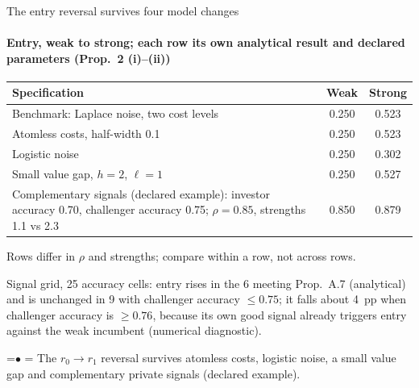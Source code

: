 \documentclass[10pt,aspectratio=169]{beamer}
\newcommand{\TakeawayBody}[1]{\begin{minipage}{\textwidth}\raggedright\normalsize
    \setbox0=\hbox{{\usebeamercolor[fg]{structure}\raise0.7pt\hbox{\scriptsize$\bullet$}}\hspace{0.55em}}%
    \hangindent=\wd0 \hangafter=1 \noindent\box0 #1\par
  \end{minipage}}
\renewcommand{\TakeawayWithNav}[2][\ExhibitReadingGap]{\par\vspace{#1}\noindent\TakeawayBody{#2}\par\vspace{0.45cm}}
\begin{document}
\begin{frame}[label=F13]{The entry reversal survives four model changes}
\framesubtitle{Entry, weak to strong; each row its own analytical result and declared parameters (Prop.~2 (i)--(ii))}
\hypertarget{main:robust}{}
\vspace{2pt}
\begin{center}\small
\begin{tabular}{@{}>{\raggedright\arraybackslash}p{10.4cm}cc@{}}
\toprule
Specification & Weak & Strong\\
\midrule
Benchmark: Laplace noise, two cost levels & 0.250 %
 & 0.523\\ %
Atomless costs, half-width 0.1 %
 & 0.250 %
 & 0.523\\ %
Logistic noise & 0.250 %
 & 0.302\\ %
Small value gap, $h=2$, %
$\ell=1$ %
 & 0.250 %
 & 0.527\\ %
Complementary signals (declared example): investor accuracy 0.70, %
challenger accuracy 0.75; %
$\rho=0.85$, %
strengths 1.1 %
vs 2.3 %
 & 0.850 %
 & 0.879\\ %
\bottomrule
\end{tabular}
\end{center}
\vspace{-3pt}
{\color{cGrayText}\footnotesize Rows differ in $\rho$ and strengths; compare within a row, not across rows.\par
\vspace{2pt}
Signal grid, 25 accuracy cells: entry rises in the 6 meeting Prop.~A.7 (analytical) and is unchanged in 9 with challenger accuracy ${}\le0.75$; it falls about 4~pp when challenger accuracy is ${}\ge0.76$, because its own good signal already triggers entry against the weak incumbent (numerical diagnostic).\par}
\TakeawayWithNav[0.5em]{The $r_0\to r_1$ reversal survives atomless costs, logistic noise, a small value gap and complementary private signals (declared example).}
\end{frame}
\end{document}
